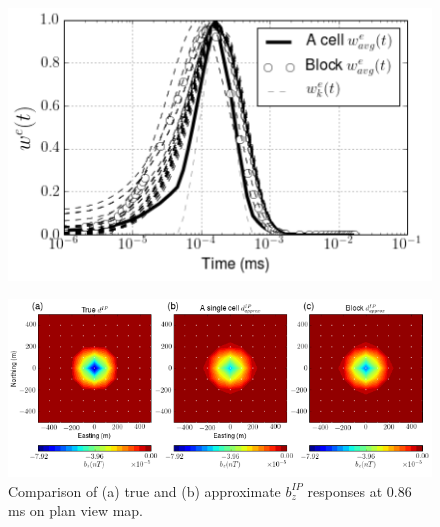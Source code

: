 \documentclass[a4paper, 11pt]{article}
\begin{document}
\begin{figure}[htb]
  \centering
  \includegraphics[width=1.\textwidth]{figures/AveragedWe.png}
  \caption{}
  \label{F:AveragedWe}
\end{figure}
\clearpage

\begin{figure}[htb]
  \centering
  \includegraphics[width=1.\textwidth]{figures/EquivPeta_True_Approx.png}
  \caption{Comparison of (a) true and (b) approximate $b_z^{IP}$ responses at 0.86 ms on plan view map.}
  \label{F:EquivPeta_True_Approx}
\end{figure}
\clearpage


\end{document}
